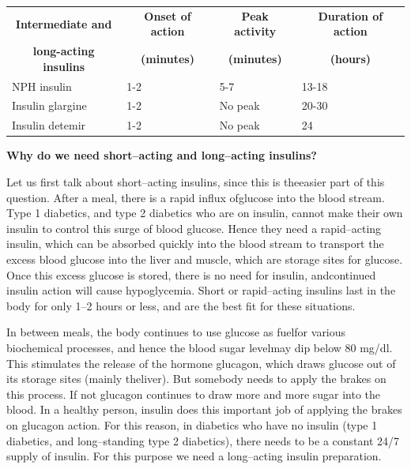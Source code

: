 {
\begin{center}
\small\addtolength{\tabcolsep}{-4pt}
\begin{tabular}{|l|l|l|l|}
\hline
\multicolumn{1}{|c|}{\textbf{Intermediate and}} & \multicolumn{1}{c|}{\textbf{Onset of action}} & \multicolumn{1}{c|}{\textbf{Peak activity}} & \multicolumn{1}{c|}{\textbf{Duration of action}}\\
\multicolumn{1}{|c|}{\textbf{long-acting insulins}} & \multicolumn{1}{c|}{\textbf{(minutes)}} & \multicolumn{1}{c|}{\textbf{(minutes)}} & \multicolumn{1}{c|}{\textbf{(hours)}}\\
\hline
NPH insulin & 1-2 & 5-7 & 13-18\\
\hline
Insulin glargine & 1-2 & No peak & 20-30\\
\hline
Insulin detemir & 1-2 & No peak & 24\\
\hline
\end{tabular}
\end{center}
}\relax

\noindent\textbf{Why do we need short–acting and long–acting insulins?}

Let us first talk about short–acting insulins, since this is the\break easier part of this question. After a meal, there is a rapid influx of\break glucose into the blood stream. Type 1 diabetics, and type 2 diabetics who are on insulin, cannot make their own insulin to control this surge of blood glucose. Hence they need a rapid–acting insulin, which can be absorbed quickly into the blood stream to transport the excess blood glucose into the liver and muscle, which are storage sites for glucose. Once this excess glucose is stored, there is no need for insulin, and\break continued insulin action will cause hypoglycemia. Short or rapid–\break acting insulins last in the body for only 1–2 hours or less, and are the best fit for these situations.

In between meals, the body continues to use glucose as fuel\break for various biochemical processes, and hence the blood sugar level\break may dip below 80 mg/dl. This stimulates the release of the hormone gluca\-gon, which draws glucose out of its storage sites (mainly the\break liver). But somebody needs to apply the brakes on this process. If not gluca\-gon continues to draw more and more sugar into the blood. In a healthy person, insulin does this important job of applying the brakes on gluca\-gon action. For this reason, in diabetics who have no insulin (type 1 diabetics, and long–standing type 2 diabetics), there needs to be a constant 24/7 supply of insulin. For this purpose we need a long–acting insulin preparation.

